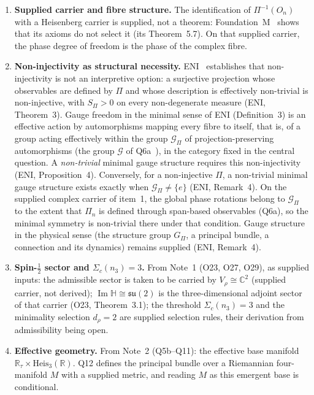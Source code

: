 \documentclass[11pt,a4paper]{article}
\theoremstyle{definition}
\newcommand{\Heis}{\mathrm{Heis}}
\newcommand{\su}{\mathfrak{su}}
\newcommand{\Gpi}{G_{\Pi}}
\newcommand{\ImH}{\operatorname{Im}\mathbb{H}}
\begin{document}
    \begin{enumerate}
      \item \textbf{Supplied carrier and fibre structure.}
      The identification of $\Pi^{-1}(O_n)$ with a Heisenberg carrier is supplied, not a theorem:
      Foundation~M~\cite{Beau2026m} shows that its axioms do not select it (its Theorem~5.7).
      On that supplied carrier, the phase degree of freedom is the phase of the complex fibre.

      \item \textbf{Non-injectivity as structural necessity.}
      ENI~\cite{Beau2026l} establishes that non-injectivity is not an interpretive option: a
      surjective projection whose observables are defined by $\Pi$ and whose description is
      effectively non-trivial is non-injective, with $S_\Pi > 0$ on every non-degenerate measure
      (ENI, Theorem~3).
      Gauge freedom in the minimal sense of ENI (Definition~3) is an effective action by automorphisms
      mapping every fibre to itself, that is, of a group acting effectively within the group
      $\mathcal{G}_\Pi$ of projection-preserving automorphisms (the group $\mathcal{G}$ of
      Q6a~\cite{Beau2026q6a}), in the category fixed in the central question.
      A \emph{non-trivial} minimal gauge structure requires this non-injectivity (ENI,
      Proposition~4).
      Conversely, for a non-injective $\Pi$, a non-trivial minimal gauge structure exists exactly when
      $\mathcal{G}_\Pi \neq \{e\}$ (ENI, Remark~4).
      On the supplied complex carrier of item~1, the global phase rotations belong to
      $\mathcal{G}_\Pi$ to the extent that $\Pi_n$ is defined through span-based observables (Q6a),
      so the minimal symmetry is non-trivial there under that condition.
      Gauge structure in the physical sense (the structure group $\Gpi$, a principal bundle, a
      connection and its dynamics) remains supplied (ENI, Remark~4).

      \item \textbf{Spin-$\tfrac{1}{2}$ sector and $\Sigma_c(n_3) = 3$.}
      From Note~1 (O23, O27, O29), as supplied inputs: the admissible sector is taken to be
      carried by $V_\rho \cong \mathbb{C}^2$ (supplied carrier, not derived);
      $\ImH \cong \su(2)$ is the three-dimensional adjoint sector of that carrier (O23,
      Theorem~3.1); the threshold $\Sigma_c(n_3) = 3$ and the minimality selection $d_\rho = 2$ are
      supplied selection rules, their derivation from admissibility being open.

      \item \textbf{Effective geometry.}
      From Note~2 (Q5b--Q11): the effective base manifold $\mathbb{R}_\tau \times
      \Heis_3(\mathbb{R})$.
      Q12 defines the principal bundle over a Riemannian four-manifold $M$ with a supplied metric,
      and reading $M$ as this emergent base is conditional.
    \end{enumerate}
\end{document}
